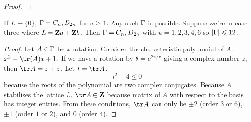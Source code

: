 \documentclass[11pt, oneside]{amsart}
\numberwithin{equation}{section}
\numberwithin{theorem}{section}
\theoremstyle{definition}
\let\bar\relax
\let\bf\relax
\def\Z{\mathbf{Z}}
\begin{document}
{\begin{proof}
\end{proof}
If $L=\{0\}$, $\bar\Gamma=C_n, D_{2n}$ for $n\geqslant 1$. Any such $\bar\Gamma$ is possible. Suppose we're in case three where $L=\Z\bf a+\Z\bf b$. Then $\bar\Gamma = C_n, D_{2n}$ with $n=1,2,3,4,6$ so $|\bar\Gamma| \leqslant 12$.
\begin{proof}
Let $A\in \bar \Gamma$ be a rotation. Consider the characteristic polynomial of $A$: $x^2 - \tr(A)x + 1.$
If we have a rotation by $\theta = e^{2\pi/n}$ giving a complex number $z$, then $\tr A = z + \bar z$.
Let $t = \tr A$. 
$$
t^2 - 4 \leqslant 0
$$
because the roots of the polynomial are two complex conjugates. Because $A$ stabilizes the lattice $L$, $\tr A\in \Z$ because matrix of $A$ with respect to the basis has integer entries. From these conditions, $\tr A$ can only be $\pm 2$ (order $3$ or $6$), $\pm 1$ (order $1$ or $2$), and $0$ (order $4$).
\end{proof}

}
\end{document}
